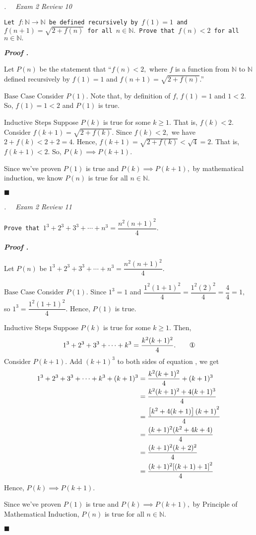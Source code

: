 \documentclass[11pt,letter]{article}
\newcounter{nq}[section]
\newcounter{np}[section]
\newenvironment*{p}{\par\noindent\textbf{\textit{Proof \stepcounter{np}\thenp. }}\par}{\par\hfill $\blacksquare$\par}
\newenvironment*{q}[1]{\noindent\emph{\thesection.\stepcounter{nq}\thenq$\quad $ #1}\par\noindent\texttt}{}
\def\N{{\mathbb{N}}}
\begin{document}
\begin{framed}\begin{q}
	{Exam 2 Review 10}
	{Let $f:\N\to\N$ be defined recursively by $f(1)=1$ and $f(n+1)=\sqrt{2+f(n)}$ for all $n\in\N.$ Prove that $f(n)<2$ for all $n\in\N.$}
\end{q}\end{framed}
\begin{p}
	Let $P(n)$ be the statement that ``$f(n)<2,$ where $f$ is a function from $\N$ to $\N$ defined recursively by $f(1)=1$ and $f(n+1)=\sqrt{2+f(n)}$.''\par 
	$\boxed{\text{Base Case}}$ Consider $P(1)$. Note that, by definition of $f$, $f(1)=1$ and $1<2$. So, $f(1)=1<2$ and $P(1)$ is true.\par 
	$\boxed{\text{Inductive Steps}}$ Suppose $P(k)$ is true for some $k\geq1.$ That is, $f(k)<2.$ Consider $f(k+1)=\sqrt{2+f(k)}.$ Since $f(k)<2,$ we have $2+f(k)<2+2=4.$ Hence, $f(k+1)=\sqrt{2+f(k)}<\sqrt{4}=2.$ That is, $f(k+1)<2.$ So, $P(k)\implies P(k+1).$\par 
	Since we've proven $P(1)$ is true and $P(k)\implies P(k+1),$ by mathematical induction, we know $P(n)$ is true for all $n\in\N.$
\end{p}

\begin{framed}\begin{q}
	{Exam 2 Review 11}
	{Prove that $1^3+2^3+3^3+\cdots+n^3=\dfrac{n^2(n+1)^2}{4}.$}
\end{q}\end{framed}
\begin{p}
	Let $P(n)$ be $1^3+2^3+3^3+\cdots+n^3=\dfrac{n^2(n+1)^2}{4}.$\par 
	$\boxed{\text{Base Case}}$ Consider $P(1).$ Since $1^3=1$ and $\dfrac{1^2(1+1)^2}{4}=\dfrac{1^2(2)^2}{4}=\dfrac{4}{4}=1,$ so $1^3=\dfrac{1^2(1+1)^2}{4}.$ Hence, $P(1)$ is true.\par 
	$\boxed{\text{Inductive Steps}}$ Suppose $P(k)$ is true for some $k\geq1.$ Then, \[1^3+2^3+3^3+\cdots+k^3=\dfrac{k^2(k+1)^2}{4}.\qquad\text{\ding{172}}\] Consider $P(k+1).$ Add $(k+1)^3$ to both sides of equation , we get \[\begin{aligned}1^3+2^3+3^3+\cdots+k^3+(k+1)^3&=\dfrac{k^2(k+1)^2}{4}+(k+1)^3\\&=\dfrac{k^2(k+1)^2+4(k+1)^3}{4}\\&=\dfrac{\qty[k^2+4(k+1)](k+1)^2}{4}\\&=\dfrac{(k+1)^2(k^2+4k+4)}{4}\\&=\dfrac{(k+1)^2(k+2)^2}{4}\\&=\dfrac{(k+1)^2\qty[(k+1)+1]^2}{4}\end{aligned}\] Hence, $P(k)\implies P(k+1).$\par 
	Since we've proven $P(1)$ is true and $P(k)\implies P(k+1),$ by Principle of Mathematical Induction, $P(n)$ is true for all $n\in\N.$
\end{p}
\end{document}
